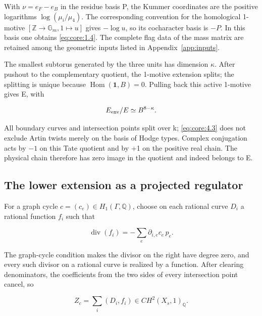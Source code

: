 \documentclass[11pt,a4paper,oneside]{article}
\theoremstyle{plain}
\theoremstyle{definition}
\theoremstyle{remark}
\numberwithin{equation}{section}
\begin{document}
With \(\nu=e_F-e_B\) in the residue basis P, the Kummer coordinates are the positive logarithms \(\log(\mu_i/\mu_4)\). The corresponding convention for the homological 1-motive \([\mathbb Z\to\mathbb G_m,1\mapsto u]\) gives \(-\log u\), so its cocharacter basis is \(- P\). In this basis one obtains \eqref{eq:core:1.4}. The complete flag data of the mass matrix are retained among the geometric inputs listed in Appendix~\ref{app:inputs}.

The smallest subtorus generated by the three units has dimension \(\kappa \). After pushout to the complementary quotient, the 1-motive extension splits; the splitting is unique because \(\operatorname{Hom}(\mathbf1,B)=0\). Pulling back this active 1-motive gives E, with

\begin{equation}
E_{\rm env}/E\simeq B^{8-\kappa}.    \label{eq:core:4.3}
\end{equation}

All boundary curves and intersection points split over k; \eqref{eq:core:4.3} does not exclude Artin twists merely on the basis of Hodge types. Complex conjugation acts by \(- 1\) on this Tate quotient and by +1 on the positive real chain. The physical chain therefore has zero image in the quotient and indeed belongs to E.


\subsection{The lower extension as a projected regulator}\label{sec:core:5}

For a graph cycle \(c=(c_e)\in H_1(\Gamma,\mathbb Q)\), choose on each rational curve \(D_i\) a rational function \(f_i\) such that

\begin{equation}
\operatorname{div}(f_i)=-\sum_e\partial_{i,e}c_e\,p_e.
                                                               \label{eq:core:5.1}
\end{equation}

The graph-cycle condition makes the divisor on the right have degree zero, and every such divisor on a rational curve is realized by a function. After clearing denominators, the coefficients from the two sides of every intersection point cancel, so

\begin{equation}
Z_c=\sum_i(D_i,f_i)\in CH^2(X_s,1)_{\mathbb Q}. 
                                                               \label{eq:core:5.2}
\end{equation}
\end{document}
